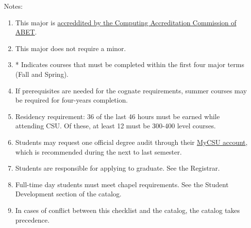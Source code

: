 Notes:%
\begin{enumerate}\footnotesize
	\item This major is
		\href{https://www.abet.org/accreditation/what-is-accreditation/why-abet-accreditation-matters/}{accreddited by the Computing Accreditation Commission of ABET}.
	\item This major does not require a minor.
	\item * Indicates courses that must be completed within the first four major terms (Fall and Spring).
	\item If prerequisites are needed for the cognate requirements, summer courses may be required for four-years completion.
	\item Residency requirement: 36 of the last 46 hours must be earned while attending CSU. Of these, at least 12 must be 300-400 level courses.
	\item Students may request one official degree audit through their \href{https://portal.csuniv.edu/}{MyCSU account}, which is recommended during the next to last semester.
	\item Students are responsible for applying to graduate. See the Registrar.
	\item Full-time day students must meet chapel requirements. See the Student Development section of the catalog.
	\item In cases of conflict between this checklist and the catalog, the catalog takes precedence.
\end{enumerate}